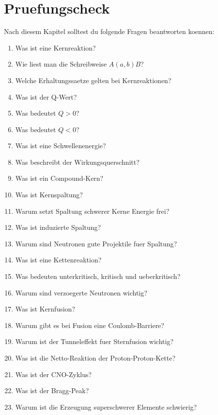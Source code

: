 \section{Pruefungscheck}

\begin{examtipbox}
Nach diesem Kapitel solltest du folgende Fragen beantworten koennen:
\begin{enumerate}
    \item Was ist eine Kernreaktion?
    \item Wie liest man die Schreibweise $A(a,b)B$?
    \item Welche Erhaltungssaetze gelten bei Kernreaktionen?
    \item Was ist der Q-Wert?
    \item Was bedeutet $Q>0$?
    \item Was bedeutet $Q<0$?
    \item Was ist eine Schwellenenergie?
    \item Was beschreibt der Wirkungsquerschnitt?
    \item Was ist ein Compound-Kern?
    \item Was ist Kernspaltung?
    \item Warum setzt Spaltung schwerer Kerne Energie frei?
    \item Was ist induzierte Spaltung?
    \item Warum sind Neutronen gute Projektile fuer Spaltung?
    \item Was ist eine Kettenreaktion?
    \item Was bedeuten unterkritisch, kritisch und ueberkritisch?
    \item Warum sind verzoegerte Neutronen wichtig?
    \item Was ist Kernfusion?
    \item Warum gibt es bei Fusion eine Coulomb-Barriere?
    \item Warum ist der Tunneleffekt fuer Sternfusion wichtig?
    \item Was ist die Netto-Reaktion der Proton-Proton-Kette?
    \item Was ist der CNO-Zyklus?
    \item Was ist der Bragg-Peak?
    \item Warum ist die Erzeugung superschwerer Elemente schwierig?
\end{enumerate}
\end{examtipbox}